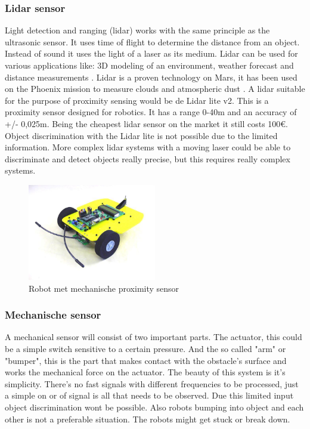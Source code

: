 \documentclass[10pt,a4paper]{article}
\begin{document}
\subsubsection{Lidar sensor}
Light detection and ranging (lidar) works with the same principle as the ultrasonic sensor. It uses time of flight to determine the distance from an object. Instead of sound it uses the light of a laser as its medium. Lidar can be used for various applications like: 3D modeling of an environment, weather forecast and distance measurements \cite{whatlidar}. Lidar is a proven technology on Mars, it has been used on the Phoenix mission to measure clouds and atmospheric dust \cite{lidarmars}. A lidar suitable for the purpose of proximity sensing would be de Lidar lite v2. This is a proximity sensor designed for robotics. It has a range 0-40m and an accuracy of +/- 0,025m. Being the cheapest lidar sensor on the market it still costs 100\euro. Object discrimination with the Lidar lite is not possible due to the limited information. More complex lidar systems with a moving laser could be able to discriminate and detect objects really precise, but this requires really complex systems.


\begin{figure}[!ht]

  \centering
      \includegraphics[width=0.5\textwidth]{voelsprieten.jpg}
  \caption{Robot met mechanische proximity sensor}  \label{voelspriet}
 
\end{figure}

\subsubsection{Mechanische sensor}
A mechanical sensor will consist of two important parts. The actuator, this could be a simple switch sensitive to a certain pressure. And the so called "arm" or "bumper", this is the part that makes contact with the obstacle's surface and works the mechanical force on the actuator. The beauty of this system is it's simplicity. There's no fast signals with different frequencies to be processed, just a simple on or of signal is all that needs to be observed. Due this limited input object discrimination wont be possible. Also robots bumping into object and each other is not a preferable situation. The robots might get stuck or break down.
\end{document}

